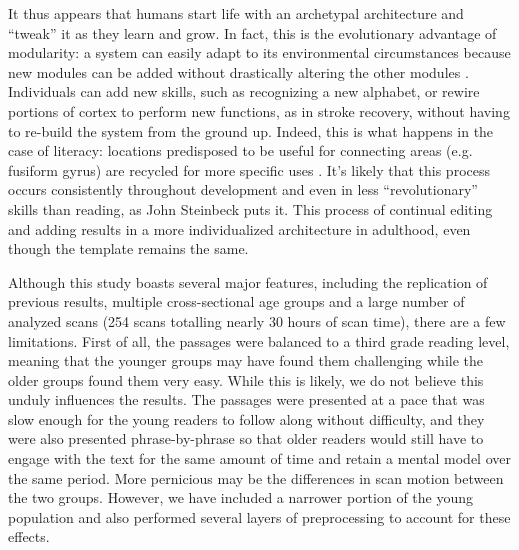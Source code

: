 It thus appears that humans start life with an archetypal architecture  and ``tweak'' it as they learn and grow. In fact, this is the evolutionary advantage of modularity: a system can easily adapt to its environmental circumstances because new modules can be added without drastically altering the other modules \citep{Kashtan2005}. Individuals can add new skills, such as recognizing a new alphabet, or rewire portions of cortex to perform new functions, as in stroke recovery, without having to re-build the system from the ground up. Indeed, this is what happens in the case of literacy: locations predisposed to be useful for connecting areas (e.g. fusiform gyrus) are recycled for more specific uses \citep{Saygin2016}. It's likely that this process occurs consistently throughout development and even in less ``revolutionary'' skills than reading, as John Steinbeck puts it. This process of continual editing and adding results in a more individualized architecture in adulthood, even though the template remains the same. 

Although this study boasts several major features, including the replication of previous results, multiple cross-sectional age groups and a large number of analyzed scans (254 scans totalling nearly 30 hours of scan time), there are a few limitations. First of all, the passages were balanced to a third grade reading level, meaning that the younger groups may have found them challenging while the older groups found them very easy. While this is likely, we do not believe this unduly influences the results. The passages were presented at a pace that was slow enough for the young readers to follow along without difficulty, and they were also presented phrase-by-phrase so that older readers would still have to engage with the text for the same amount of time and retain a mental model over the same period. More pernicious may be the differences in scan motion between the two groups. However, we have included a narrower portion of the young population and also performed several layers of preprocessing to account for these effects.   

